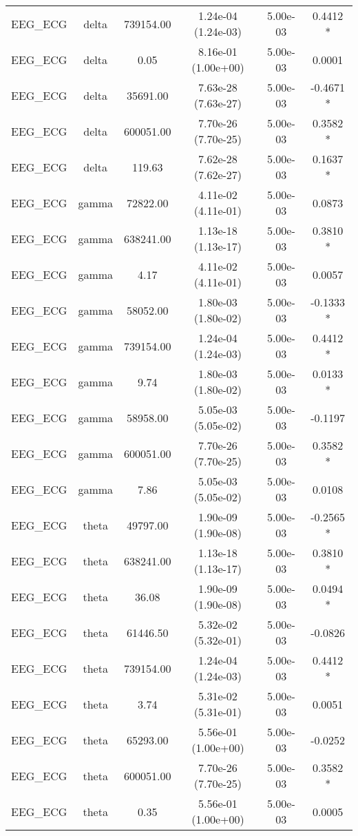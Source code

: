\begin{tabular}{lccccc}
EEG\_ECG & delta & 739154.00 & 1.24e-04 (1.24e-03) & 5.00e-03 & 0.4412 * \\
EEG\_ECG & delta & 0.05 & 8.16e-01 (1.00e+00) & 5.00e-03 & 0.0001  \\
EEG\_ECG & delta & 35691.00 & 7.63e-28 (7.63e-27) & 5.00e-03 & -0.4671 * \\
EEG\_ECG & delta & 600051.00 & 7.70e-26 (7.70e-25) & 5.00e-03 & 0.3582 * \\
EEG\_ECG & delta & 119.63 & 7.62e-28 (7.62e-27) & 5.00e-03 & 0.1637 * \\
EEG\_ECG & gamma & 72822.00 & 4.11e-02 (4.11e-01) & 5.00e-03 & 0.0873  \\
EEG\_ECG & gamma & 638241.00 & 1.13e-18 (1.13e-17) & 5.00e-03 & 0.3810 * \\
EEG\_ECG & gamma & 4.17 & 4.11e-02 (4.11e-01) & 5.00e-03 & 0.0057  \\
EEG\_ECG & gamma & 58052.00 & 1.80e-03 (1.80e-02) & 5.00e-03 & -0.1333 * \\
EEG\_ECG & gamma & 739154.00 & 1.24e-04 (1.24e-03) & 5.00e-03 & 0.4412 * \\
EEG\_ECG & gamma & 9.74 & 1.80e-03 (1.80e-02) & 5.00e-03 & 0.0133 * \\
EEG\_ECG & gamma & 58958.00 & 5.05e-03 (5.05e-02) & 5.00e-03 & -0.1197  \\
EEG\_ECG & gamma & 600051.00 & 7.70e-26 (7.70e-25) & 5.00e-03 & 0.3582 * \\
EEG\_ECG & gamma & 7.86 & 5.05e-03 (5.05e-02) & 5.00e-03 & 0.0108  \\
EEG\_ECG & theta & 49797.00 & 1.90e-09 (1.90e-08) & 5.00e-03 & -0.2565 * \\
EEG\_ECG & theta & 638241.00 & 1.13e-18 (1.13e-17) & 5.00e-03 & 0.3810 * \\
EEG\_ECG & theta & 36.08 & 1.90e-09 (1.90e-08) & 5.00e-03 & 0.0494 * \\
EEG\_ECG & theta & 61446.50 & 5.32e-02 (5.32e-01) & 5.00e-03 & -0.0826  \\
EEG\_ECG & theta & 739154.00 & 1.24e-04 (1.24e-03) & 5.00e-03 & 0.4412 * \\
EEG\_ECG & theta & 3.74 & 5.31e-02 (5.31e-01) & 5.00e-03 & 0.0051  \\
EEG\_ECG & theta & 65293.00 & 5.56e-01 (1.00e+00) & 5.00e-03 & -0.0252  \\
EEG\_ECG & theta & 600051.00 & 7.70e-26 (7.70e-25) & 5.00e-03 & 0.3582 * \\
EEG\_ECG & theta & 0.35 & 5.56e-01 (1.00e+00) & 5.00e-03 & 0.0005  \\

\end{tabular}
